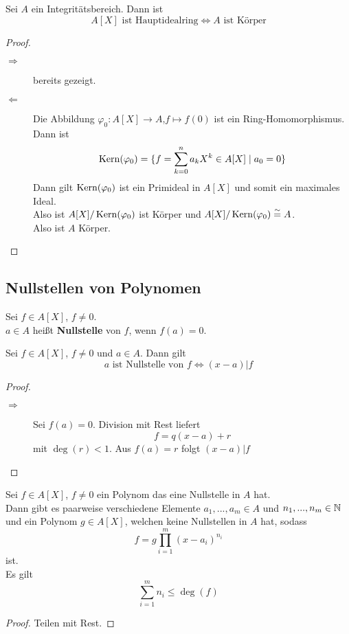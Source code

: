 	\begin{satz}
		Sei $A$ ein Integritätsbereich. Dann ist
		\[\text{$A[X]$ ist Hauptidealring}\Leftrightarrow A\text{ ist Körper}\]
	\end{satz}

	\begin{proof}
		\begin{description}
			\item[$\Rightarrow$] bereits gezeigt.
			\item[$\Leftarrow$] Die Abbildung $\varphi_0:A[X]\to A$,$f\mapsto f(0)$ ist ein Ring-Homomorphismus. Dann ist
			\[\operatorname{Kern}(\varphi_0)=\{f=\sum_{k=0}^{n}a_kX^k\in A[X]\mid a_0=0\}\]
			Dann gilt $\operatorname{Kern}(\varphi_0)$ ist ein Primideal in $A[X]$ und somit ein maximales Ideal.\\
			Also ist $A[X]/\operatorname{Kern}(\varphi_0)$ ist Körper und $A[X]/\operatorname{Kern}(\varphi_0)\overset{\sim}{=} A$.\\
			Also ist $A$ Körper.
		\end{description}
	\end{proof}


	\subsection{Nullstellen von Polynomen}
	\begin{definition}
		Sei $f\in A[X]$, $f\neq 0$.\\
		$a\in A$ heißt \textbf{Nullstelle} von $f$, wenn $f(a)=0$.
	\end{definition}

	\begin{satz}
		Sei $f\in A[X]$, $f\neq 0$ und $a\in A$. Dann gilt
		\[\text{$a$ ist Nullstelle von $f$}\Leftrightarrow (x-a)|f\]
	\end{satz}
	\begin{proof}
		\begin{description}
			\item[$\Rightarrow$] Sei $f(a)=0$. Division mit Rest liefert
			\[ f=q(x-a)+r\]
			mit $\deg(r)< 1$. Aus $f(a)=r$ folgt $(x-a)|f$
		\end{description}
	\end{proof}

	\begin{satz}
		Sei $f\in A[X]$, $f\neq 0$ ein Polynom das eine Nullstelle in $A$ hat.\\
		Dann gibt es paarweise verschiedene Elemente $a_1,...,a_m\in A$ und $n_1,...,n_m\in\mathbb{N}$ und ein Polynom $g\in A[X]$, welchen keine Nullstellen in $A$ hat, sodass
		\[f=g\prod_{i=1}^m(x-a_i)^{n_i}\]
		ist.\\
		Es gilt
		\[\sum_{i=1}^{m}n_i\leq\deg(f)\]
	\end{satz}
	\begin{proof}
		Teilen mit Rest.
	\end{proof}

